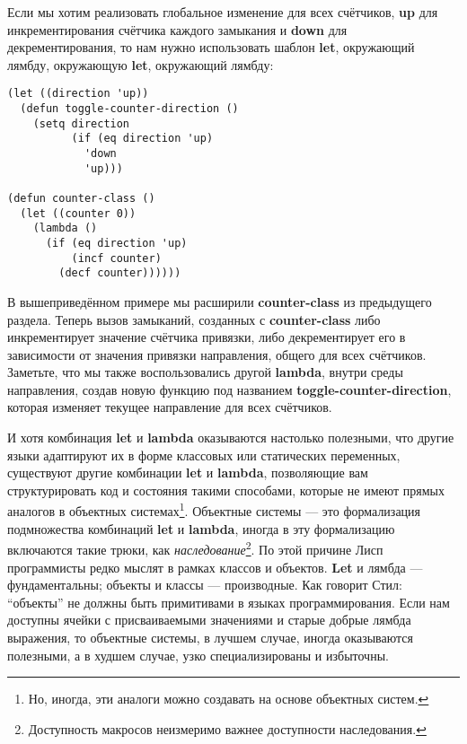 Если мы хотим реализовать глобальное изменение для всех счётчиков, \textbf{up} для инкрементирования счётчика каждого замыкания и \textbf{down} для декрементирования, то нам нужно использовать шаблон \textbf{let}, окружающий лямбду, окружающую \textbf{let}, окружающий лямбду:

\begin{verbatim}
(let ((direction 'up))
  (defun toggle-counter-direction ()
    (setq direction
          (if (eq direction 'up)
            'down
            'up)))

(defun counter-class ()
  (let ((counter 0))
    (lambda ()
      (if (eq direction 'up)
          (incf counter)
        (decf counter))))))
\end{verbatim}

В вышеприведённом примере мы расширили \textbf{counter-class} из предыдущего раздела. Теперь вызов замыканий, созданных с \textbf{counter-class} либо инкрементирует значение счётчика привязки, либо декрементирует его в зависимости от значения привязки направления, общего для всех счётчиков. Заметьте, что мы также воспользовались другой \textbf{lambda}, внутри среды направления, создав новую функцию под названием {\textbf{tog\-gle-coun\-ter-di\-rec\-tion}}, которая изменяет текущее направление для всех счётчиков.

И хотя комбинация \textbf{let} и \textbf{lambda} оказываются настолько полезными, что другие языки адаптируют их в форме классовых или статических переменных, существуют другие комбинации \textbf{let} и \textbf{lambda}, позволяющие вам структурировать код и состояния такими способами, которые не имеют прямых аналогов в объектных системах\footnote{Но, иногда, эти аналоги можно создавать на основе объектных систем.}. Объектные системы --- это формализация подмножества комбинаций \textbf{let} и \textbf{lambda}, иногда в эту формализацию включаются такие трюки, как \emph{наследование}\footnote{Доступность макросов неизмеримо важнее доступности наследования.}. По этой причине Лисп программисты редко мыслят в рамках классов и объектов. \textbf{Let} и лямбда --- фундаментальны; объекты и классы --- производные. Как говорит Стил: ``объекты'' не должны быть примитивами в языках программирования. Если нам доступны ячейки с присваиваемыми значениями и старые добрые лямбда выражения, то объектные системы, в лучшем случае, иногда оказываются полезными, а в худшем случае, узко специализированы и избыточны.
